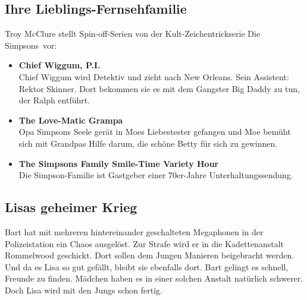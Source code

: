 \subsection{Ihre Lieblings-Fernsehfamilie}\label{4F20}
Troy McClure stellt Spin-off-Serien von der Kult-Zeichentrickserie \glqq Die Simpsons\grqq\ vor: 
\begin{itemize}
	\item \textbf{Chief Wiggum, P.I.}\\ Chief Wiggum wird Detektiv und zieht nach New Orleans. Sein Assistent: Rektor Skinner. Dort bekommen sie es mit dem Gangster Big Daddy zu tun, der Ralph entführt.
	\item \textbf{The Love-Matic Grampa}\\ Opa Simpsons Seele gerät in Moes Liebestester gefangen und Moe bemüht sich mit Grandpas Hilfe darum, die schöne Betty für sich zu gewinnen.
	\item \textbf{The Simpsons Family Smile-Time Variety Hour}\\ Die Simpson-Familie ist Gastgeber einer 70er-Jahre Unterhaltungssendung.
\end{itemize}


	
\subsection{Lisas geheimer Krieg}
Bart hat mit mehreren hintereinander geschalteten Megaphonen in der Polizeistation ein Chaos ausgelöst. Zur Strafe wird er in die Kadettenanstalt Rommelwood geschickt. Dort sollen dem Jungen Manieren beigebracht werden. Und da es Lisa so gut gefällt, bleibt sie ebenfalls dort. Bart gelingt es schnell, Freunde zu finden. Mädchen haben es in einer solchen Anstalt natürlich schwerer. Doch Lisa wird mit den Jungs schon fertig.




